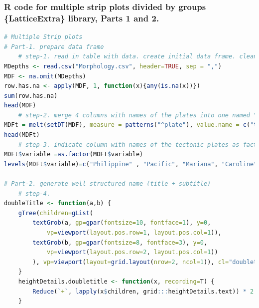 \documentclass[pdflatex,compress,10pt,
	xcolor={dvipsnames,dvipsnames,svgnames,x11names,table},
	hyperref={colorlinks = true,breaklinks = true, urlcolor = NavyBlue, breaklinks = true}]{beamer}
\begin{document}
\begin{frame}[fragile,shrink=20]\frametitle{R code for multiple strip plots divided by groups\\ \{LatticeExtra\} library, Parts 1 and 2.}
\begin{lstlisting}[language=R]
# Multiple Strip plots  
# Part-1. prepare data frame
	# step-1. read in table with data. create initial data frame. clean up data frame from the NA values
MDepths <- read.csv("Morphology.csv", header=TRUE, sep = ",")
MDF <- na.omit(MDepths) 
row.has.na <- apply(MDF, 1, function(x){any(is.na(x))}) 
sum(row.has.na) 
head(MDF)
	# step-2. merge 4 columns with names of the plates into one named "tectonic plates" 
MDFt = melt(setDT(MDF), measure = patterns("^plate"), value.name = c("tectonic plates"))
head(MDFt)
	# step-3. indicate column with names of the tectonic plates as factor value (variable) 
MDFt$variable =as.factor(MDFt$variable)
levels(MDFt$variable)=c("Philippine" , "Pacific", "Mariana", "Caroline") # implicitly write the names of the 4 plates to be indicated on the X axis

# Part-2. generate well structured name (title + subtitle)
	# step-4. 
doubleTitle <- function(a,b) {     
	gTree(children=gList(         
		textGrob(a, gp=gpar(fontsize=10, fontface=1), y=0,              
			vp=viewport(layout.pos.row=1, layout.pos.col=1)),         
		textGrob(b, gp=gpar(fontsize=8, fontface=3), y=0,              
			vp=viewport(layout.pos.row=2, layout.pos.col=1))     
		), vp=viewport(layout=grid.layout(nrow=2, ncol=1)), cl="doubletitle") 
	}  
	heightDetails.doubletitle <- function(x, recording=T) {     
		Reduce(`+`, lapply(x$children, grid:::heightDetails.text)) * 2 
	}
\end{lstlisting}
\end{frame}
\end{document}
